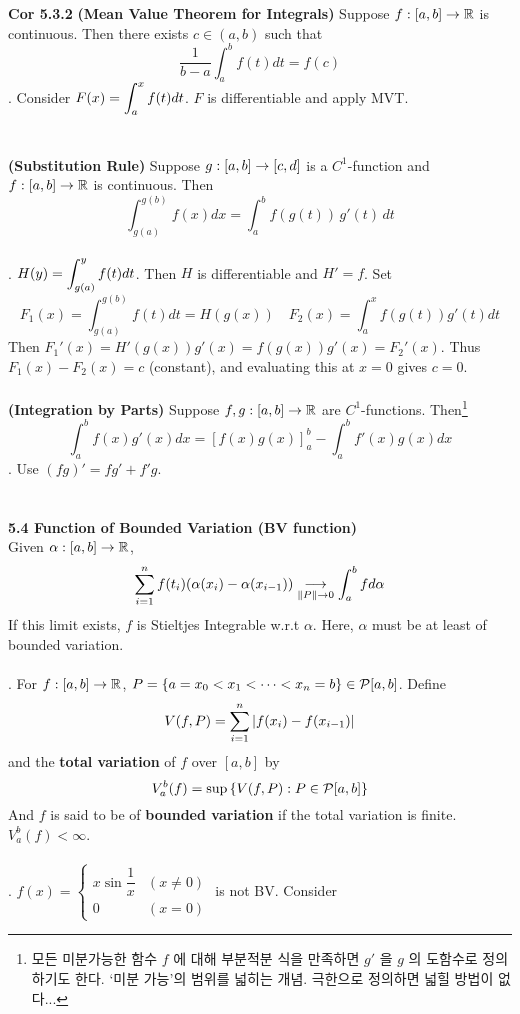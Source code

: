 \textbf{Cor 5.3.2} \textbf{(Mean Value Theorem for Integrals)} Suppose $f:[a, b]\rightarrow\mathbb{R}$ is continuous. Then there exists $c\in (a, b)$ such that
$$\frac{1}{b-a}\int_a^b f(t)dt = f(c)$$
\pf. Consider $F(x) = \displaystyle\int_a^x f(t)dt$. $F$ is differentiable and apply MVT.\\
\\
\\
 \textbf{(Substitution Rule)} Suppose $g:[a, b]\rightarrow[c, d]$ is a $C^1$-function and $f:[a, b]\rightarrow\mathbb{R}$ is continuous. Then
$$\int_{g(a)}^{g(b)}f(x)dx = \int_a^b f(g(t))\,g'(t)\,dt$$
\\
\pf. $\displaystyle H(y) = \int_{g(a)}^y f(t)dt$. Then $H$ is differentiable and $H'=f$. Set $$F_1(x) = \int_{g(a)}^{g(b)}f(t)dt = H(g(x)) \quad F_2(x) = \int_a^x f(g(t))g'(t)dt$$
Then $F_1'(x) = H'(g(x))g'(x) = f(g(x))g'(x) = F_2'(x)$. Thus $F_1(x) - F_2(x) = c$ (constant), and evaluating this at $x=0$ gives $c = 0$.
\\
\\
 \textbf{(Integration by Parts)} Suppose $f, g:[a, b]\rightarrow\mathbb{R}$ are $C^1$-functions. Then\footnote{모든 미분가능한 함수 $f$ 에 대해 부분적분 식을 만족하면 $g'$ 을 $g$ 의 도함수로 정의하기도 한다. `미분 가능'의 범위를 넓히는 개념. 극한으로 정의하면 넓힐 방법이 없다...}
$$\int_a^b f(x)g'(x) dx = \left[f(x)g(x)\right]_a^b - \int_a^b f'(x)g(x)dx$$
\pf. Use $(fg)' = fg' + f'g$.
\\\\\\
\textbf{5.4 Function of Bounded Variation (BV function)}\\
Given $\alpha: [a, b]\rightarrow\mathbb{R}$, $$\sum_{i=1}^n f(t_i)(\alpha(x_i) - \alpha(x_{i-1})) \underset{\left\lVert P\right\rVert\rightarrow 0}{\longrightarrow} \int_a^b f d\alpha $$
If this limit exists, $f$ is Stieltjes Integrable w.r.t $\alpha$. Here, $\alpha$ must be at least of bounded variation.\\
\\
. For $f:[a, b]\rightarrow\mathbb{R}$, $P = \{a=x_0 < x_1 < \cdots < x_n=b\} \in \mathcal{P}[a, b]$. Define $$V(f, P) = \sum_{i=1}^n \left|f(x_i) - f(x_{i-1})\right|$$
and the \textbf{total variation} of $f$ over $[a, b]$ by
$$V_a^b(f) = \sup \left\{V(f, P): P \in \mathcal{P}[a, b]\right\}$$
And $f$ is said to be of \textbf{bounded variation} if the total variation is finite. $V_a^b(f) < \infty$.\\
\\
\ex. $f(x) = \begin{cases}
	x\sin \dfrac{1}{x} & (x \neq 0) \\ 0 & (x = 0)
\end{cases}$ is not BV. Consider

